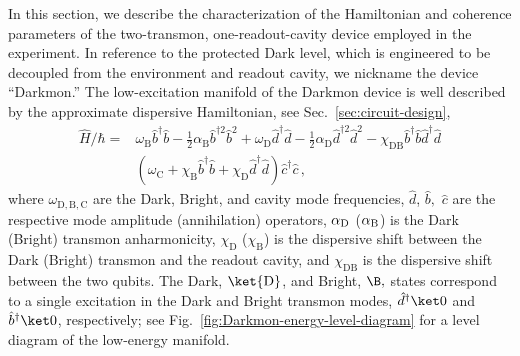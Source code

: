 In this section, we describe the characterization of the Hamiltonian
and coherence parameters of the two-transmon, one-readout-cavity device
employed in the experiment. In reference to the protected Dark level,
which is engineered to be decoupled from the environment and readout
cavity, we  nickname the device ``Darkmon.''  The low-excitation
manifold of the Darkmon device is well described by the approximate
dispersive Hamiltonian, see Sec.~\ref{sec:circuit-design}, 
\begin{align}
\hat{H}/\hbar= & \omega_{\mathrm{B}}\hat{b}^{\dagger}\hat{b}-\frac{1}{2}\alpha_{\mathrm{B}}\hat{b}^{\dagger2}\hat{b}^{2}+\omega_{\mathrm{D}}\hat{d}^{\dagger}\hat{d}-\frac{1}{2}\alpha_{\mathrm{D}}\hat{d}^{\dagger2}\hat{d}^{2}-\chi_{\mathrm{DB}}\hat{b}^{\dagger}\hat{b}\hat{d}^{\dagger}\hat{d}\label{eq:Hamiltonian-of-sys}\\
 & \left(\omega_{\mathrm{C}}+\chi_{\mathrm{B}}\hat{b}^{\dagger}\hat{b}+\chi_{\mathrm{D}}\hat{d}^{\dagger}\hat{d}\right)\hat{c}^{\dagger}\hat{c}\,,\nonumber 
\end{align}
where $\omega_{\mathrm{D,B,C}}$ are the Dark, Bright, and cavity
mode frequencies, $\hat{d}$, $\hat{b},$ $\hat{c}$ are the respective
mode amplitude (annihilation) operators, $\alpha_{{\rm D}}$ ($\alpha_{{\rm B}}$)
is the Dark (Bright) transmon anharmonicity, $\chi_{\mathrm{D}}$
($\chi_{\mathrm{B}}$) is the dispersive shift between the Dark (Bright)
transmon and the readout cavity, and $\chi_{\mathrm{DB}}$ is the
dispersive shift between the two qubits. The Dark, $\ket{\mathrm{D}}$,
and Bright, $\B,$ states correspond to a single excitation in the
Dark and Bright transmon modes, $\hat{d}^{\dagger}\ket0$ and $\hat{b}^{\dagger}\ket0$,
respectively; see Fig.~\ref{fig:Darkmon-energy-level-diagram} for
a level diagram of the low-energy manifold. 

